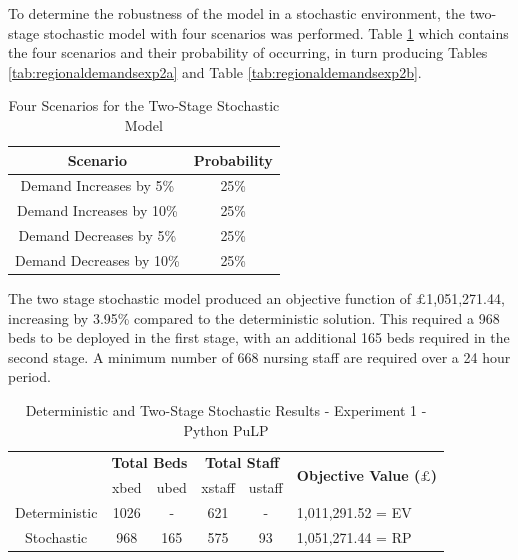 \documentclass[../thesis.tex]{subfiles}
\begin{document}
To determine the robustness of the model in a stochastic environment, the two-stage stochastic model with four scenarios was performed. Table \ref{tab:stochasticscenarios} which contains the four scenarios and their probability of occurring, in turn producing Tables \ref{tab:regionaldemandsexp2a} and Table \ref{tab:regionaldemandsexp2b}.

\begin{table}[h!]
    \centering
    \begin{tabular}{@{}cc@{}}\toprule
       \textbf{Scenario}  &\textbf{Probability}  \\\midrule
       Demand Increases by 5\% & 25\% \\ 
       Demand Increases by 10\% & 25\% \\
       Demand Decreases by 5\% & 25\% \\ 
       Demand Decreases by 10\% & 25\% \\\bottomrule
    \end{tabular}
    \caption{Four Scenarios for the Two-Stage Stochastic Model}
    \label{tab:stochasticscenarios}
\end{table}

The two stage stochastic model produced an objective function of $\pounds$1,051,271.44, increasing by 3.95\% compared to the deterministic solution. This required a 968 beds to be deployed in the first stage, with an additional 165 beds required in the second stage. A minimum number of 668 nursing staff are required over a 24 hour period.

\begin{table}[h!]
    \centering
    \begin{tabular}{cccccl}\toprule
 & \multicolumn{2}{l}{\textbf{Total Beds}} & \multicolumn{2}{c}{\textbf{Total Staff}} & \multirow{2}{*}{\textbf{Objective Value ($\pounds$)}}\\ \cmidrule(lr){2-3} \cmidrule(lr){4-5}
 & xbed           & ubed          & xstaff         & ustaff         \\ \midrule
      Deterministic & 1026 & - &  621 & - & 1,011,291.52 =  EV \\ \midrule
      Stochastic & 968  & 165 &  575 & 93 &1,051,271.44 = RP\\  \bottomrule
    \end{tabular}
    \caption{Deterministic and Two-Stage Stochastic Results - Experiment 1 - Python PuLP}
    \label{tab:dettwostageresults1python}
\end{table}
\end{document}
